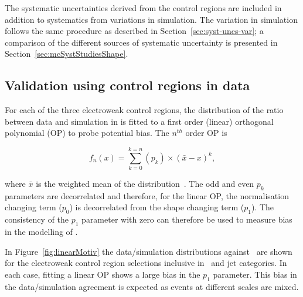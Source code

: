 The systematic uncertainties derived from the control regions
are included in addition to systematics from variations in simulation.
The variation in simulation follows the same procedure as described in
Section~\ref{sec:syst-uncs-var}; a comparison of the different sources of systematic uncertainty
is presented in Section~\ref{sec:mcSystStudiesShape}.

\subsection{Validation using control regions in data}
\label{sec:valid13}

For each of the three electroweak control regions, the distribution of the ratio 
between data and simulation in \mht is fitted to a first order (linear) orthogonal polynomial (OP)
to probe potential bias. The $n^{th}$ order OP is 

\begin{equation}
  \label{equ:orthog-polynomial}
  f_n(x) = \sum_{k=0}^{k=n}{(p_k)\times(\bar{x}-x)^k},
\end{equation}

where $\bar{x}$ is the weighted mean of the distribution~\cite{cohen2013applied}. 
The odd and even $p_k$ parameters are decorrelated and therefore, for the linear OP,
the normalisation changing term ($p_0$) is decorrelated from the shape changing term ($p_1$).
The consistency of the $p_1$ parameter with zero can therefore be used to measure bias in the
modelling of \mht. 

In Figure~\ref{fig:linearMotiv} the data/simulation
distributions against \mht~are shown for the electroweak control region selections 
inclusive in \scalht~and jet categories. In each case, 
fitting a linear OP shows a large bias in the $p_1$ parameter. 
This bias in the data/simulation agreement is expected as events 
at different scales are mixed. 


